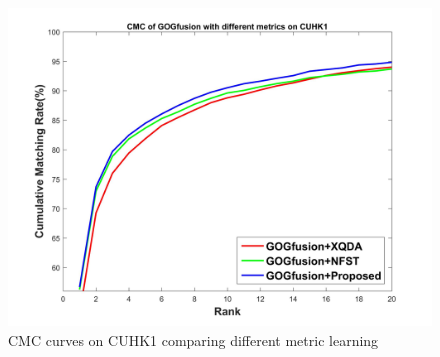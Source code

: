 \documentclass[10pt,twocolumn,letterpaper]{article}
\begin{document}
\begin{figure}
\begin{raggedleft}
\includegraphics[width=1\linewidth]{CUHK1.jpg}
\vspace{-2em}
\caption{CMC curves on CUHK1 comparing different metric learning}
\end{raggedleft}
\end{figure}

\end{document}

